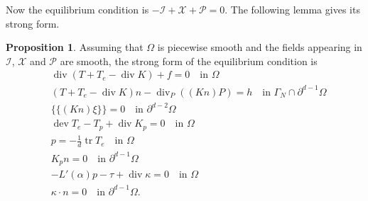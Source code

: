 \documentclass[a4paper,10pt,oneside]{amsbook}
\numberwithin{section}{chapter}
\numberwithin{equation}{chapter}
\theoremstyle{definition}
\newtheorem{prop}{Proposition}[chapter]
\DeclareMathOperator{\dev}{dev}
\DeclareMathOperator{\diver}{div}
\DeclareMathOperator{\tr}{tr}
\begin{document}
Now the equilibrium condition is $-\mathcal{I}+\mathcal{X}+\mathcal{P}=0$. The following lemma gives its strong form.
\begin{prop}
\label{prop:strong-form-pressure-sensitive-small}
Assuming that $\Omega$ is piecewise smooth and the fields appearing in $\mathcal{I}$, $\mathcal{X}$ and $\mathcal{P}$ are smooth, the strong form of the equilibrium condition is
\begin{align*}
&\diver(T+T_e-\diver K)+f=0\quad\text{in $\Omega$} \\
&(T+T_e-\diver K)n-\diver_P((Kn)P)=h\quad\text{in $\Gamma_N\cap\partial^{d-1}\Omega$} \\
&\{\!\!\{(Kn)\xi\}\!\!\}=0\quad\text{in $\partial^{d-2}\Omega$} \\
&\dev T_e-T_p+\diver K_p=0\quad\text{in $\Omega$} \\
&p=-\frac{1}{d}\tr T_e\quad\text{in $\Omega$} \\
&K_p n=0\quad\text{in $\partial^{d-1}\Omega$} \\
&-L'(\alpha)p-\tau+\diver\kappa=0\quad\text{in $\Omega$} \\
&\kappa\cdot n=0\quad\text{in $\partial^{d-1}\Omega$}.
\end{align*}
\end{prop}
\end{document}
